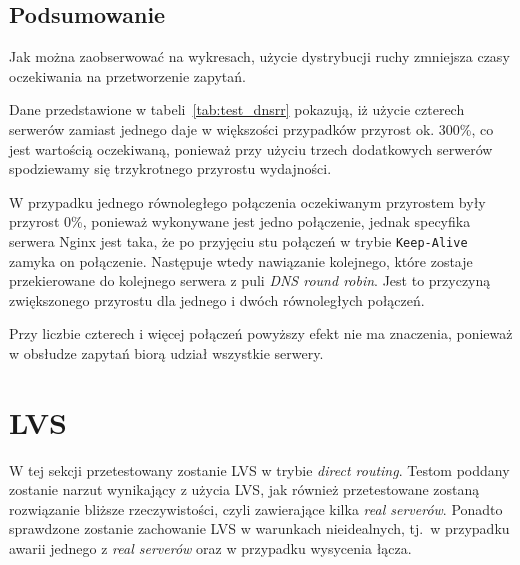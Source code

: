 \subsection{Podsumowanie}
Jak można zaobserwować na wykresach, użycie dystrybucji ruchy zmniejsza czasy oczekiwania na przetworzenie zapytań.

Dane przedstawione w tabeli~\ref{tab:test_dnsrr} pokazują, iż użycie czterech serwerów zamiast jednego daje w większości przypadków przyrost ok. 300\%, co jest wartością oczekiwaną, ponieważ przy użyciu trzech dodatkowych serwerów spodziewamy się trzykrotnego przyrostu wydajności.

W przypadku jednego równoległego połączenia oczekiwanym przyrostem były przyrost 0\%, ponieważ wykonywane jest jedno połączenie, jednak specyfika serwera Nginx jest taka, że po przyjęciu stu połączeń w trybie \texttt{Keep-Alive} zamyka on połączenie.
Następuje wtedy nawiązanie kolejnego, które zostaje przekierowane do kolejnego serwera z puli \textit{DNS round robin}.
Jest to przyczyną zwiększonego przyrostu dla jednego i dwóch równoległych połączeń.

Przy liczbie czterech i więcej połączeń powyższy efekt nie ma znaczenia, ponieważ w obsłudze zapytań biorą udział wszystkie serwery.
\section{LVS}
W tej sekcji przetestowany zostanie LVS w trybie \textit{direct routing}.
Testom poddany zostanie narzut wynikający z użycia LVS, jak również przetestowane zostaną rozwiązanie bliższe rzeczywistości, czyli zawierające kilka \textit{real serverów}.
Ponadto sprawdzone zostanie zachowanie LVS w warunkach nieidealnych, tj.\ w przypadku awarii jednego z \textit{real serverów} oraz w przypadku wysycenia łącza.
